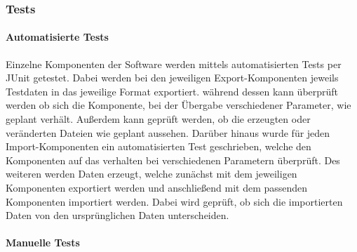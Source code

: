 \subsubsection{Tests}
\paragraph{Automatisierte Tests}
Einzelne Komponenten der Software werden mittels automatisierten Tests per JUnit getestet. Dabei werden bei den jeweiligen Export-Komponenten jeweils Testdaten in das jeweilige Format exportiert. während dessen kann überprüft werden ob sich die Komponente, bei der Übergabe verschiedener Parameter, wie geplant verhält. Außerdem kann geprüft werden, ob die erzeugten oder veränderten Dateien wie geplant aussehen. Darüber hinaus wurde für jeden Import-Komponenten ein automatisierten Test geschrieben, welche den Komponenten auf das verhalten bei verschiedenen Parametern überprüft. Des weiteren werden Daten erzeugt, welche zunächst mit dem jeweiligen Komponenten exportiert werden und anschließend mit dem passenden Komponenten importiert werden. Dabei wird geprüft, ob sich die importierten Daten von den ursprünglichen Daten unterscheiden.

\paragraph{Manuelle Tests}